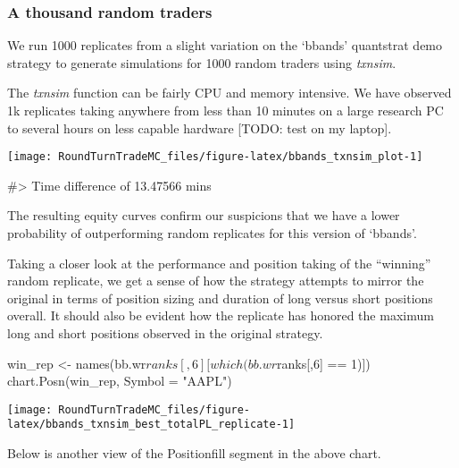\hypertarget{a-thousand-random-traders}{%
\subsubsection{A thousand random
traders}\label{a-thousand-random-traders}}

We run 1000 replicates from a slight variation on the `bbands'
quantstrat demo strategy to generate simulations for 1000 random traders
using \emph{txnsim}.

The \emph{txnsim} function can be fairly CPU and memory intensive. We
have observed 1k replicates taking anywhere from less than 10 minutes on
a large research PC to several hours on less capable hardware {[}TODO:
test on my laptop{]}.

\begin{Schunk}


\begin{center}\texttt{[image: RoundTurnTradeMC\_files/figure-latex/bbands\_txnsim\_plot-1]} \end{center}

\begin{Soutput}
#> Time difference of 13.47566 mins
\end{Soutput}
\end{Schunk}

The resulting equity curves confirm our suspicions that we have a lower
probability of outperforming random replicates for this version of
`bbands'.

Taking a closer look at the performance and position taking of the
``winning'' random replicate, we get a sense of how the strategy
attempts to mirror the original in terms of position sizing and duration
of long versus short positions overall. It should also be evident how
the replicate has honored the maximum long and short positions observed
in the original strategy.

\begin{Schunk}
\begin{Sinput}
win_rep <- names(bb.wr$ranks[,6][which(bb.wr$ranks[,6] == 1)])
chart.Posn(win_rep, Symbol = "AAPL") 
\end{Sinput}


\begin{center}\texttt{[image: RoundTurnTradeMC\_files/figure-latex/bbands\_txnsim\_best\_totalPL\_replicate-1]} \end{center}

\end{Schunk}

Below is another view of the Positionfill segment in the above chart.

